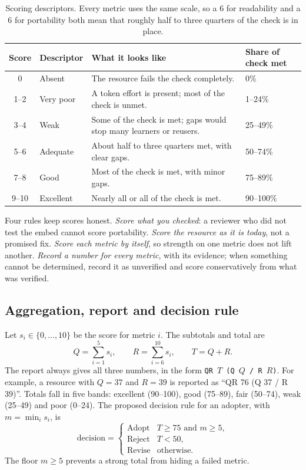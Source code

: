 \begin{table}[htbp]
\centering
\caption{Scoring descriptors. Every metric uses the same scale, so a 6 for readability and a 6 for portability both mean that roughly half to three quarters of the check is in place.}
\label{tab:bands}
\small
\begin{tabular}{@{}cL{2.2cm}L{6.5cm}C{2.4cm}@{}}
\toprule
Score & Descriptor & What it looks like & Share of check met \\
 & Absent & The resource fails the check completely. & 0\% \\
1--2 & Very poor & A token effort is present; most of the check is unmet. & 1--24\% \\
3--4 & Weak & Some of the check is met; gaps would stop many learners or reusers. & 25--49\% \\
5--6 & Adequate & About half to three quarters met, with clear gaps. & 50--74\% \\
7--8 & Good & Most of the check is met, with minor gaps. & 75--89\% \\
9--10 & Excellent & Nearly all or all of the check is met. & 90--100\% \\
\bottomrule
\end{tabular}
\end{table}

Four rules keep scores honest. \emph{Score what you checked}: a reviewer who did not test the embed cannot score portability. \emph{Score the resource as it is today}, not a promised fix. \emph{Score each metric by itself}, so strength on one metric does not lift another. \emph{Record a number for every metric}, with its evidence; when something cannot be determined, record it as unverified and score conservatively from what was verified.

\subsection{Aggregation, report and decision rule}
Let $s_i \in \{0,\dots,10\}$ be the score for metric $i$. The subtotals and total are
\begin{equation}
  Q = \sum_{i=1}^{5} s_i, \qquad R = \sum_{i=6}^{10} s_i, \qquad T = Q + R .
  \label{eq:total}
\end{equation}
The report always gives all three numbers, in the form \texttt{QR $T$ (Q $Q$ / R $R$)}. For example, a resource with $Q=37$ and $R=39$ is reported as ``QR 76 (Q 37 / R 39)''. Totals fall in five bands: excellent (90--100), good (75--89), fair (50--74), weak (25--49) and poor (0--24). The proposed decision rule for an adopter, with $m=\min_i s_i$, is
\begin{equation}
  \text{decision} =
  \begin{cases}
    \text{Adopt}  & T \ge 75 \text{ and } m \ge 5,\\
    \text{Reject} & T < 50,\\
    \text{Revise} & \text{otherwise.}
  \end{cases}
  \label{eq:decision}
\end{equation}
The floor $m \ge 5$ prevents a strong total from hiding a failed metric.

